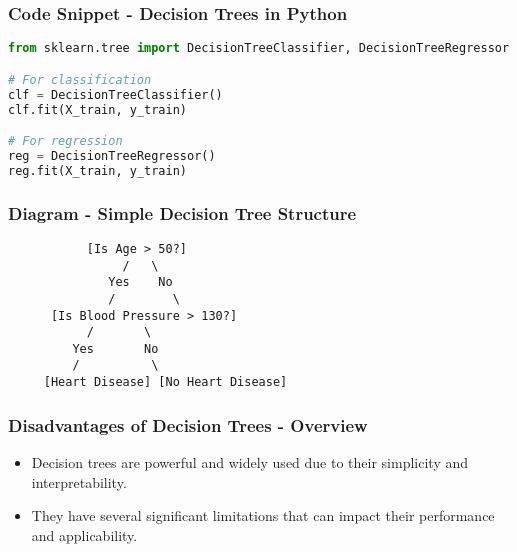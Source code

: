 \documentclass[aspectratio=169]{beamer}
\begin{document}
\begin{frame}[fragile]
    \frametitle{Code Snippet - Decision Trees in Python}
    \begin{lstlisting}[language=Python]
from sklearn.tree import DecisionTreeClassifier, DecisionTreeRegressor

# For classification
clf = DecisionTreeClassifier()
clf.fit(X_train, y_train)

# For regression
reg = DecisionTreeRegressor()
reg.fit(X_train, y_train)
    \end{lstlisting}
\end{frame}

\begin{frame}[fragile]
    \frametitle{Diagram - Simple Decision Tree Structure}
    \begin{center}
        
        \begin{verbatim}
           [Is Age > 50?]
                /   \
              Yes    No
              /        \
      [Is Blood Pressure > 130?] 
           /       \
         Yes       No
         /          \
     [Heart Disease] [No Heart Disease]
        \end{verbatim}
    \end{center}
\end{frame}

\begin{frame}[fragile]
    \frametitle{Disadvantages of Decision Trees - Overview}
    \begin{itemize}
        \item Decision trees are powerful and widely used due to their simplicity and interpretability.
        \item They have several significant limitations that can impact their performance and applicability.
    \end{itemize}
\end{frame}
\end{document}
